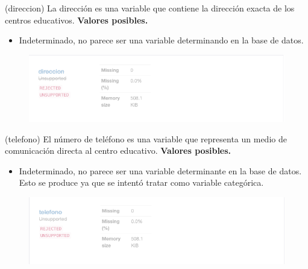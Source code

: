 
\begin{variable}(direccion) 
La dirección es una variable que contiene la dirección exacta de los centros educativos.
\bigbreak 
\textbf{Valores posibles.}
\begin{itemize}
	\item Indeterminado, no parece ser una variable determinando en la base de datos.
\end{itemize}
\begin{figure}[H]
	\centering
	\includegraphics[scale=0.5]{Images/16}
\end{figure}
\end{variable}


\begin{variable}(telefono) 
El número de teléfono es una variable que representa un medio de comunicación directa al centro educativo. 
\bigbreak 
\textbf{Valores posibles.}
\begin{itemize}
	\item Indeterminado, no parece ser una variable determinante en la base de datos. Esto se produce ya que se intentó tratar como variable categórica. 
\end{itemize}
\begin{figure}[H]
	\centering
	\includegraphics[scale=0.5]{Images/17}
\end{figure}
\end{variable}
















